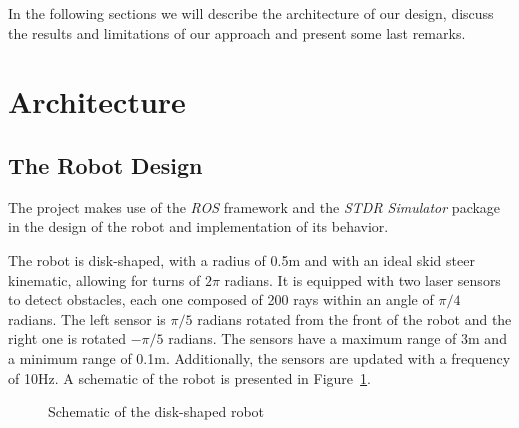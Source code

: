 \documentclass[10pt,journal,compsoc]{IEEEtran}
\begin{document}
In the following sections we will describe the architecture of our design, discuss the results and limitations of our approach and present some last remarks.


\section{Architecture}
\subsection{The Robot Design}

The project makes use of the \textit{ROS} framework and the \textit{STDR Simulator} package in the design of the robot and implementation of its behavior.

The robot is disk-shaped, with a radius of 0.5m and with an ideal skid steer kinematic, allowing for turns of $2\pi$ radians. It is equipped with two laser sensors to detect obstacles, each one composed of 200 rays within an angle of $\pi/4$ radians. The left sensor is $\pi/5$ radians rotated from the front of the robot and the right one is rotated $-\pi/5$ radians. The sensors have a maximum range of 3m and a minimum range of 0.1m. Additionally, the sensors are updated with a frequency of 10Hz. A schematic of the robot is presented in Figure~\ref{fig:robot}.


\begin{figure}[thpb]
\centering
{}
\caption{Schematic of the disk-shaped robot}
\label{fig:robot}
\end{figure}
\end{document}
